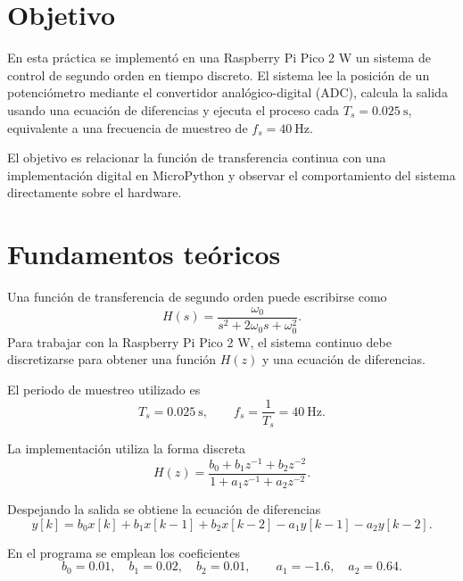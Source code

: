 \documentclass[12pt, letterpaper]{article}
\begin{document}


\section{Objetivo}

En esta práctica se implementó en una Raspberry Pi Pico 2 W un sistema de
control de segundo orden en tiempo discreto. El sistema lee la posición de un
potenciómetro mediante el convertidor analógico-digital (ADC), calcula la
salida usando una ecuación de diferencias y ejecuta el proceso cada $T_s=0.025\
    \mathrm{s}$, equivalente a una frecuencia de muestreo de $f_s=40\ \mathrm{Hz}$.

El objetivo es relacionar la función de transferencia continua con una
implementación digital en MicroPython y observar el comportamiento del sistema
directamente sobre el hardware.

\section{Fundamentos teóricos}

Una función de transferencia de segundo orden puede escribirse como
\begin{equation}
    H(s)=\frac{\omega_0}{s^2+2\omega_0s+\omega_0^2}.
\end{equation}
Para trabajar con la Raspberry Pi Pico 2 W, el sistema continuo debe
discretizarse para obtener una función $H(z)$ y una ecuación de diferencias.

El periodo de muestreo utilizado es
\begin{equation}
    T_s=0.025\ \mathrm{s},
    \qquad f_s=\frac{1}{T_s}=40\ \mathrm{Hz}.
\end{equation}

La implementación utiliza la forma discreta
\begin{equation}
    H(z)=\frac{b_0+b_1z^{-1}+b_2z^{-2}}
    {1+a_1z^{-1}+a_2z^{-2}}.
\end{equation}

Despejando la salida se obtiene la ecuación de diferencias
\begin{equation}
    y[k]=b_0x[k]+b_1x[k-1]+b_2x[k-2]
    -a_1y[k-1]-a_2y[k-2].
\end{equation}

En el programa se emplean los coeficientes
\begin{equation}
    b_0=0.01,\quad b_1=0.02,\quad b_2=0.01,
    \qquad a_1=-1.6,\quad a_2=0.64.
\end{equation}
\end{document}
